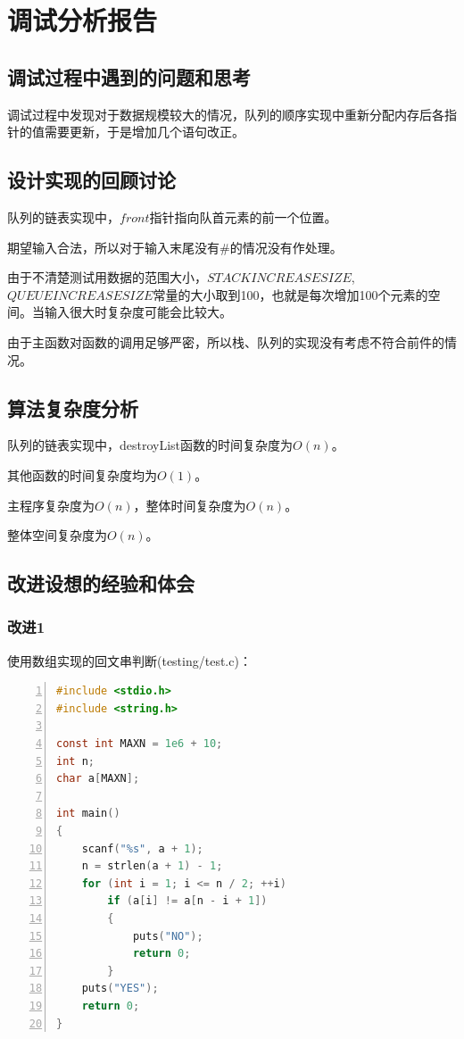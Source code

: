\documentclass{article}
\begin{document}
\section{调试分析报告}

\subsection{调试过程中遇到的问题和思考}

调试过程中发现对于数据规模较大的情况，队列的顺序实现中重新分配内存后各指针的值需要更新，于是增加几个语句改正。

\subsection{设计实现的回顾讨论}

队列的链表实现中，$front$指针指向队首元素的前一个位置。

期望输入合法，所以对于输入末尾没有\#的情况没有作处理。

由于不清楚测试用数据的范围大小，$STACKINCREASESIZE$,$QUEUEINCREASESIZE$常量的大小取到100，也就是每次增加100个元素的空间。当输入很大时复杂度可能会比较大。

由于主函数对函数的调用足够严密，所以栈、队列的实现没有考虑不符合前件的情况。

\subsection{算法复杂度分析}

队列的链表实现中，destroyList函数的时间复杂度为$O(n)$。

其他函数的时间复杂度均为$O(1)$。

主程序复杂度为$O(n)$，整体时间复杂度为$O(n)$。

整体空间复杂度为$O(n)$。

\subsection{改进设想的经验和体会}

\subsubsection{改进1}

使用数组实现的回文串判断(testing/test.c)：

\begin{lstlisting}[language={C},
    numbers=left,
    numberstyle=\tiny\consolas,
    basicstyle=\small\consolas]
#include <stdio.h>
#include <string.h>

const int MAXN = 1e6 + 10;
int n;
char a[MAXN];

int main()
{
    scanf("%s", a + 1);
    n = strlen(a + 1) - 1;
    for (int i = 1; i <= n / 2; ++i)
        if (a[i] != a[n - i + 1])
        {
            puts("NO");
            return 0;
        }
    puts("YES");
    return 0;
}
\end{lstlisting}
\end{document}
